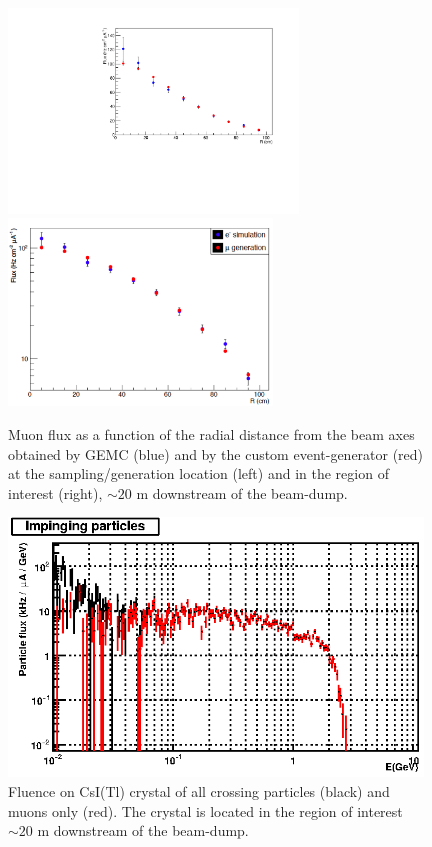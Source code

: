 \begin{figure}[h!] 
\center
\includegraphics[width=7.7cm]{figs/SimVSGen.pdf}
\includegraphics[width=7.0cm]{figs/mu-comp-far.pdf}
\caption{Muon flux as a function of the radial  distance from the beam axes obtained by GEMC (blue) and by the custom event-generator (red) at the sampling/generation location (left) and in the region of interest (right), $\sim 20$ m downstream of the beam-dump.}
\label{fig:mu-sampling-extract} 
\end{figure}


\begin{figure}[h!] 
\center
\includegraphics[width=11cm]{figs/fig19_crsA.eps}    
\caption{Fluence  on  CsI(Tl) crystal of  all crossing particles (black) and muons only (red). The crystal is located in the region of interest $\sim 20$ m downstream of the beam-dump. }
\label{fig:bg-csi}
\end{figure}

